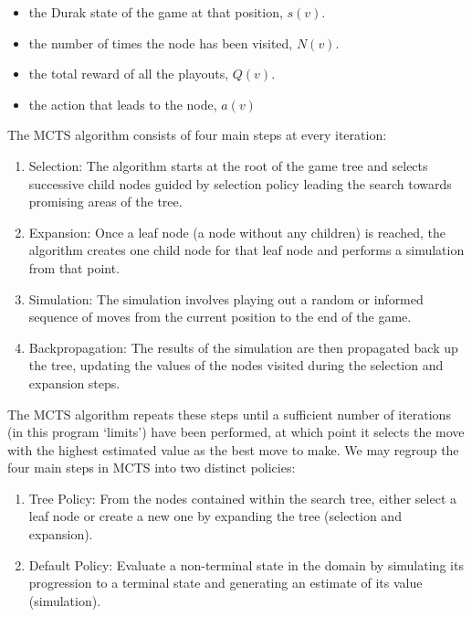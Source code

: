 \begin{itemize}
	\item the Durak state of the game at that position, $s(v)$.
	\item the number of times the node has been visited, $N(v)$.
	\item the total reward of all the playouts, $Q(v)$.
	\item the action that leads to the node, $a(v)$ 
\end{itemize}


The MCTS algorithm consists of four main steps at every iteration:

\begin{enumerate}
	\item Selection: The algorithm starts at the root of the game tree and selects successive child nodes guided by selection policy leading the search towards promising areas of the tree.
	
	\item Expansion: Once a leaf node (a node without any children) is reached, the algorithm creates one child node for that leaf node and performs a simulation from that point.
	
	\item Simulation: The simulation involves playing out a random or informed sequence of moves from the current position to the end of the game.
	
	\item Backpropagation: The results of the simulation are then propagated back up the tree, updating the values of the nodes visited during the selection and expansion steps.
	
\end{enumerate}

The MCTS algorithm repeats these steps until a sufficient number of iterations (in this program `limits') have been performed, at which point it selects the move with the highest estimated value as the best move to make. We may regroup the four main steps in MCTS into two distinct policies: 

\begin{enumerate}
	\item Tree Policy: From the nodes contained within the search tree, either select a leaf node or create a new one by expanding the tree (selection and expansion).
	
	\item Default Policy: Evaluate a non-terminal state in the domain by simulating its progression to a terminal state and generating an estimate of its value (simulation).
\end{enumerate}

